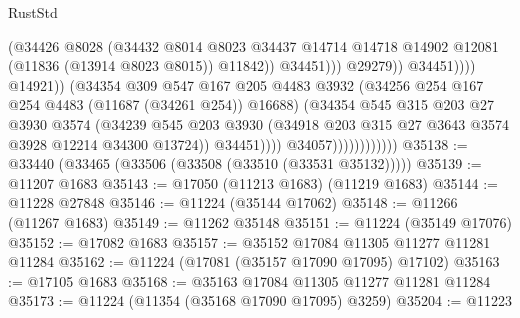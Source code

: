 \begin{lexlean}{RustStd}
\begin{coremodule}
                                                      (@34426
                                                        @8028
                                                        (@34432
                                                          @8014
                                                          @8023
                                                          @34437
                                                          @14714
                                                          @14718
                                                          @14902
                                                          @12081
                                                          (@11836 (@13914 @8023 @8015))
                                                          @11842))
                                                      @34451)))
                                                @29279))
                                            @34451))))
                                    @14921))
                                (@34354
                                  @309
                                  @547
                                  @167
                                  @205
                                  @4483
                                  @3932
                                  (@34256 @254 @167 @254 @4483 (@11687 (@34261 @254)) @16688)
                                  (@34354
                                    @545
                                    @315
                                    @203
                                    @27
                                    @3930
                                    @3574
                                    (@34239
                                      @545
                                      @203
                                      @3930
                                      (@34918 @203 @315 @27 @3643 @3574 @3928 @12214 @34300 @13724))
                                    @34451))))
                            @34057))))))))))))
@35138 := @33440 (@33465 (@33506 (@33508 (@33510 (@33531 @35132)))))
@35139 := @11207 @1683
@35143 := @17050 (@11213 @1683) (@11219 @1683)
@35144 := @11228 @27848
@35146 := @11224 (@35144 @17062)
@35148 := @11266 (@11267 @1683)
@35149 := @11262 @35148
@35151 := @11224 (@35149 @17076)
@35152 := @17082 @1683
@35157 := @35152 @17084 @11305 @11277 @11281 @11284
@35162 := @11224 (@17081 (@35157 @17090 @17095) @17102)
@35163 := @17105 @1683
@35168 := @35163 @17084 @11305 @11277 @11281 @11284
@35173 := @11224 (@11354 (@35168 @17090 @17095) @3259)
@35204 := @11223

\end{coremodule}
\end{lexlean}
